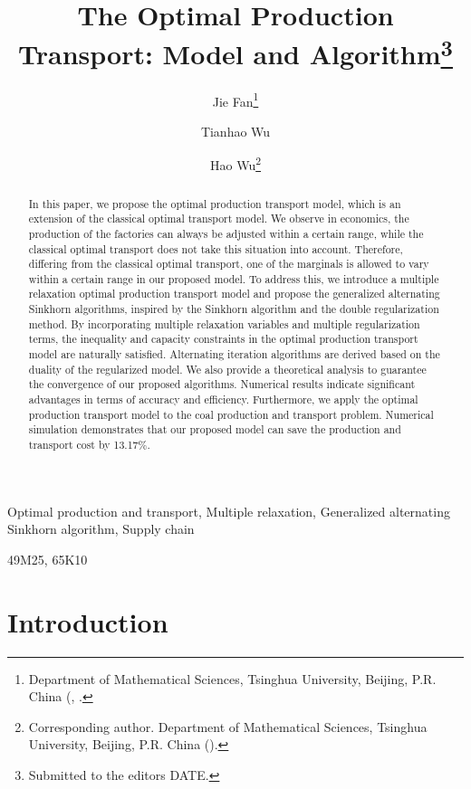 \documentclass[review,hidelinks,onefignum,onetabnum]{siamart220329}
\title{The Optimal Production Transport: Model and Algorithm\thanks{Submitted to the editors DATE.
\funding{National Natural Science Foundation of China (Grant No. 12271289). }}}
\author{Jie Fan\thanks{Department of Mathematical Sciences, Tsinghua University, Beijing, P.R. China 
(\email{fanj21@mails.tsinghua.edu.cn}, 
\email{wuth20@mails.tsinghua.edu.cn}.}
\and Tianhao Wu\footnotemark[2]
\and Hao Wu\thanks{Corresponding author. Department of Mathematical Sciences, Tsinghua University, Beijing, P.R. China (\email{hwu@tsinghua.edu.cn}).}
}
\begin{document}
\nolinenumbers

\maketitle


\begin{abstract}
In this paper, we propose the optimal production transport model, which is an extension of the classical optimal transport model. 
We observe in economics, the production of the factories can always be adjusted within a certain range, while the classical optimal transport does not take this situation into account. Therefore, differing from the classical optimal transport, one of the marginals is allowed to vary within a certain range in our proposed model. 
To address this, we introduce a multiple relaxation optimal production transport model and propose the generalized alternating Sinkhorn algorithms, inspired by the Sinkhorn algorithm and the double regularization method. By incorporating multiple relaxation variables and multiple regularization terms, the inequality and capacity constraints in the optimal production transport model are naturally satisfied. Alternating iteration algorithms are derived based on the duality of the regularized model.
We also provide a theoretical analysis to guarantee the convergence of our proposed algorithms. Numerical results indicate significant advantages in terms of accuracy and efficiency.
Furthermore, we apply the optimal production transport model to the coal production and transport problem. Numerical simulation demonstrates that our proposed model can save the production and transport cost by 13.17\%. 

\end{abstract}


\begin{keywords}
Optimal production and transport, Multiple relaxation, Generalized alternating Sinkhorn algorithm, Supply chain
\end{keywords}


\begin{MSCcodes}
49M25, 65K10
\end{MSCcodes}



\section{Introduction}
\label{sec:introduction}
 
\end{document}
